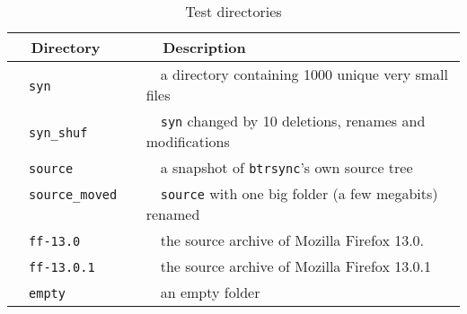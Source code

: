 \documentclass[twoside,envcountsame,runningheads]{llncs}
\newcommand{\btrsync}{\texttt{btrsync}\xspace}
\newcommand{\rsync}{\texttt{rsync}\xspace}
\def\fullversion{0} %
\newcommand{\full}[2]{%
\ifnum\fullversion=1%
#1%
\else%
#2%
\fi}
\begin{document}
\begin{table}[t]
\centering
  \caption{Test directories}
  \label{tab:benchdirec}
\begin{tabular}{ll}\toprule
~~{\bf Directory}              ~~&~~{\bf Description}\\\midrule
~~{\tt syn}              ~~&~~a directory containing 1000 unique very small files\\
~~{\tt syn\_shuf}    ~~&~~{\tt syn} changed by 10 deletions, renames and modifications \\
~~{\tt source}                 ~~& ~~a snapshot of \btrsync's own source tree \\
~~{\tt source\_moved}          ~~& ~~{\tt source} with one big folder (a few megabits) renamed\\
~~{\tt ff-13.0}           ~~& ~~the source archive of Mozilla Firefox 13.0.\\
~~{\tt ff-13.0.1}         ~~& ~~the source archive of Mozilla Firefox 13.0.1\\
~~{\tt empty}                  ~~& ~~an empty folder\\\bottomrule
\end{tabular}\smallskip
\end{table}

\end{document}
